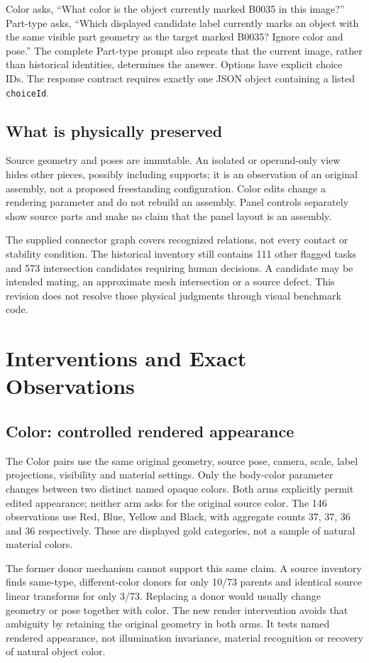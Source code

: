 \documentclass[10pt,twocolumn,letterpaper]{article}
\begin{document}
Color asks, ``What color is the object currently marked B0035 in
this image?'' Part-type asks, ``Which displayed candidate label
currently marks an object with the same visible part geometry as
the target marked B0035? Ignore color and pose.'' The complete
Part-type prompt also repeats that the current image, rather than
historical identities, determines the answer. Options have explicit
choice IDs. The response contract requires exactly one JSON object
containing a listed \texttt{choiceId}.

\subsection{What is physically preserved}
Source geometry and poses are immutable. An isolated or operand-only
view hides other pieces, possibly including supports; it is an
observation of an original assembly, not a proposed freestanding
configuration. Color edits change a rendering parameter and do not
rebuild an assembly. Panel controls separately show source parts and
make no claim that the panel layout is an assembly.

The supplied connector graph covers recognized relations, not every
contact or stability condition. The historical inventory still contains
111 other flagged tasks and 573 intersection candidates requiring
human decisions. A candidate may be intended mating, an approximate
mesh intersection or a source defect. This revision does not resolve
those physical judgments through visual benchmark code.

\section{Interventions and Exact Observations}
\subsection{Color: controlled rendered appearance}
The \EvColor{} Color pairs use the same original geometry, source
pose, camera, scale, label projections, visibility and material
settings. Only the body-color parameter changes between two distinct
named opaque colors. Both arms explicitly permit edited appearance;
neither arm asks for the original source color. The 146 observations
use Red, Blue, Yellow and Black, with aggregate counts 37, 37, 36 and
36 respectively. These are displayed gold categories, not a sample
of natural material colors.

The former donor mechanism cannot support this same claim.
A source inventory finds same-type, different-color donors for only
10/73 parents and identical source linear transforms for only 3/73.
Replacing a donor would usually change geometry or pose together
with color. The new render intervention avoids that ambiguity by
retaining the original geometry in both arms. It tests named rendered
appearance, not illumination invariance, material recognition or
recovery of natural object color.
\end{document}
